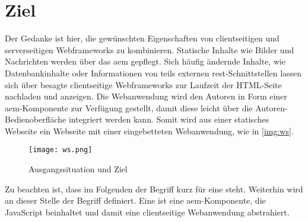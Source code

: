 \section{Ziel}
Der Gedanke ist hier, die gewünschten Eigenschaften von clientseitigen und serverseitigen Webframeworks zu kombinieren. Statische Inhalte wie Bilder und Nachrichten werden über das \ac{aem} gepflegt. Sich häufig ändernde Inhalte, wie Datenbankinhalte oder Informationen von teils externen \ac{rest}-Schnittstellen lassen sich über besagte clientseitige Webframeworks zur Laufzeit der HTML-Seite nachladen und anzeigen. Die Webanwendung wird den Autoren in Form einer \ac{aem}-Komponente zur Verfügung gestellt, damit diese leicht über die Autoren-Bedienoberfläche integriert werden kann. Somit wird aus einer statisches Webseite ein Webseite mit einer eingebetteten Webanwendung, wie in \autoref{img:ws}.\\

\begin{figure}[H]
	\begin{center}
		\texttt{[image: ws.png]}
		\caption{Ausgangssituation und Ziel}
		\label{img:ws}
	\end{center}
\end{figure}

Zu beachten ist, dass im Folgenden der Begriff  kurz für eine  steht. 
Weiterhin wird an dieser Stelle der Begriff \ajc definiert. Eine \ajc ist eine \ac{aem}-Komponente, die JavaScript beinhaltet und damit eine clientseitige Webanwendung abstrahiert.



%
